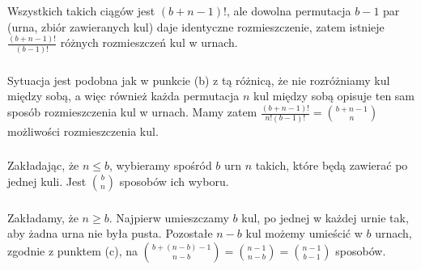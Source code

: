 Wszystkich takich ciągów jest $(b+n-1)!$, ale dowolna permutacja $b-1$ par (urna, zbiór zawieranych kul) daje identyczne rozmieszczenie, zatem istnieje $\frac{(b+n-1)!}{(b-1)!}$ różnych rozmieszczeń kul w urnach.

\subsubsection{} %
Sytuacja jest podobna jak w punkcie (b) z tą różnicą, że nie rozróżniamy kul między sobą, a więc również każda permutacja $n$ kul między sobą opisuje ten sam sposób rozmieszczenia kul w urnach. Mamy zatem $\frac{(b+n-1)!}{n!(b-1)!} = \binom{b+n-1}{n}$ możliwości rozmieszczenia kul.

\subsubsection{} %
Zakładając, że $n\le b$, wybieramy spośród $b$ urn $n$ takich, które będą zawierać po jednej kuli. Jest $\binom{b}{n}$ sposobów ich wyboru.

\subsubsection{} %
Zakładamy, że $n\ge b$. Najpierw umieszczamy $b$ kul, po jednej w każdej urnie tak, aby żadna urna nie była pusta. Pozostałe $n-b$ kul możemy umieścić w $b$ urnach, zgodnie z punktem (c), na $\binom{b+(n-b)-1}{n-b} = \binom{n-1}{n-b} = \binom{n-1}{b-1}$ sposobów.
